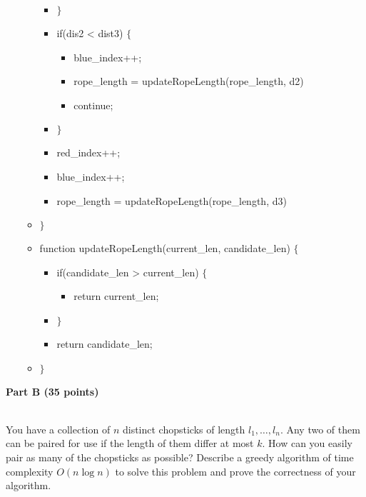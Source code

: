 \documentclass{article}
\begin{document}
\begin{itemize}
\begin{itemize}
\begin{itemize}
\item $\}$
\item if(dis2 < dist3) $\{$
\begin{itemize}
\item blue\_index++;
\item rope\_length = updateRopeLength(rope\_length, d2)
\item continue;
\end{itemize}
\item $\}$
\item red\_index++;
\item blue\_index++;
\item rope\_length = updateRopeLength(rope\_length, d3)
\end{itemize}
\item $\}$
\item function updateRopeLength(current\_len, candidate\_len) $\{$
\begin{itemize}
\item if(candidate\_len > current\_len) $\{$
\begin{itemize}
\item return current\_len;
\end{itemize}
\item $\}$
\item return candidate\_len;
\end{itemize}
\item $\}$
\end{itemize}
\end{itemize}

\begin{center}
{\bf Part B (35 points)}
\end{center}

\\

 You have a collection of $n$ distinct chopsticks of
length $l_{1},\dots,l_{n}$. Any two of them can be paired for use if
the length of them differ at most $k$. How can you easily pair as many
of the chopsticks as possible? Describe a greedy algorithm of time
complexity $O(n\log n)$ to solve this problem and prove the
correctness of your algorithm.\\
\end{document}
